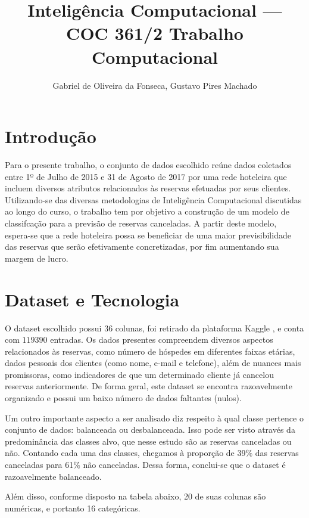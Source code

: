 \documentclass{homework}
\title{Inteligência Computacional --- COC 361\linebreak2021/2 \linebreak\linebreak Trabalho Computacional}
\author{Gabriel de Oliveira da Fonseca, Gustavo Pires Machado}
\begin{document}
\maketitle

\section{Introdução}

Para o presente trabalho, o conjunto de dados escolhido reúne dados coletados entre 1º de Julho de 2015 e 31 de Agosto
de 2017 por uma rede hoteleira que incluem diversos atributos relacionados às reservas efetuadas por seus clientes.
Utilizando-se das diversas metodologias de Inteligência Computacional discutidas ao longo do curso, o trabalho tem por
objetivo a construção de um modelo de classifcação para a previsão de reservas canceladas. A partir deste modelo,
espera-se que a rede hoteleira possa se beneficiar de uma maior previsibilidade das reservas que serão efetivamente
concretizadas, por fim aumentando sua margem de lucro.

\section{Dataset e Tecnologia}

O dataset escolhido possui 36 colunas, foi retirado da plataforma Kaggle \cite{kaggle}, e conta com $119390$ entradas. 
Os dados presentes compreendem diversos aspectos relacionados às reservas, como número de hóspedes em diferentes faixas etárias, dados
pessoais dos clientes (como nome, e-mail e telefone), além de nuances mais promissoras, como indicadores de que um
determinado cliente já cancelou reservas anteriormente. De forma geral, este dataset se encontra razoavelmente organizado e possui um baixo número de dados faltantes (nulos).

Um outro importante aspecto a ser analisado diz respeito à qual classe pertence o conjunto de dados: balanceada ou
desbalanceada. Isso pode ser visto através da predominância das classes alvo, que nesse estudo são as reservas
canceladas ou não. Contando cada uma das classes, chegamos à proporção de 39\% das reservas canceladas para 61\% não
canceladas. Dessa forma, conclui-se que o dataset é razoavelmente balanceado.

Além disso, conforme disposto na tabela abaixo, 20 de suas colunas são numéricas, e portanto 16 categóricas.
\end{document}
